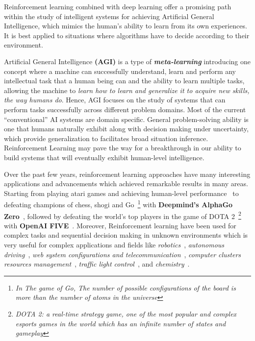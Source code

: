 Reinforcement learning combined with deep learning offer a promising path within the study of intelligent systems for achieving Artificial General Intelligence, which mimics the human's ability to learn from its own experiences. It is best applied to situations where algorithms have to decide according to their environment.

Artificial General Intelligence \textbf{(AGI)} is a type of \textit{\textbf{meta-learning}} introducing one concept where a machine can successfully understand, learn and perform any intellectual task that a human being can and the ability to learn multiple tasks, allowing the machine to \textit{learn how to learn and generalize it to acquire new skills, the way humans do}. Hence, AGI focuses on the study of systems that can perform tasks successfully across different problem domains. Most of the current ``conventional'' AI systems are domain specific. General problem-solving ability is one that humans naturally exhibit along with decision making under uncertainty, which provide generalization to facilitates broad situation inference.
Reinforcement Learning may pave the way for a breakthrough in our ability to build systems that will eventually exhibit human-level intelligence.

Over the past few years, reinforcement learning approaches have many interesting applications and advancements which achieved remarkable results in many areas. Starting from playing atari games and achieving human-level performance~\parencite{mnih2015human} to defeating champions of chess, shogi and Go~\footnote{\textit{In The game of Go, The number of possible configurations of the board is more than the number of atoms in the universe}} with \textbf{Deepmind's AlphaGo Zero}~\parencite{silver2017mastering}, followed by defeating the world's top players in the game of DOTA 2~\footnote{\textit{DOTA 2: a real-time strategy game, one of the most popular and complex esports games in the world which has an infinite number of states and gameplay}} with \textbf{OpenAI FIVE}~\parencite{OpenAI_dota}. Moreover, Reinforcement learning have been used for complex tasks and sequential decision making in unknown environments which is very useful for complex applications and fields like \textit{robotics}~\parencite{kober2013reinforcement, levine2016end, 45926, singh2019end}, \textit{autonomous driving}~\parencite{sallab2017deep, xu2018zero}, \textit{web system configurations and telecommunication}~\parencite{bu2009reinforcement}, \textit{computer clusters resources management}~\parencite{mao2016resource}, \textit{traffic light control}~\parencite{arel2010reinforcement}, and \textit{chemistry}~\parencite{zhou2017optimizing}.

